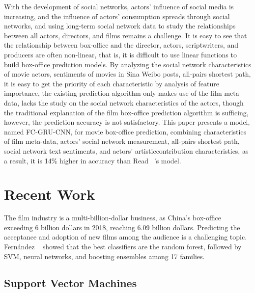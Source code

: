 \documentclass[review]{cvpr}
\begin{document}
  With the development of social networks, actors' influence of social media is increasing, and the influence of actors' consumption spreads through social networks,
  and using long-term social network data to study the relationships between all actors, directors, and films remains a challenge.
  It is easy to see that the relationship between box-office and the director, actors, scriptwriters, and producers are often non-linear, that is,
  it is difficult to use linear functions to build box-office prediction models.
  By analyzing the social network characteristics of movie actors, sentiments of movies in Sina Weibo posts, all-pairs shortest path,
  it is easy to get the priority of each characteristic by analysis of feature importance,
  the existing prediction algorithm only makes use of the film meta-data, lacks the study on the social network characteristics of the actors,
  though the traditional explanation of the film box-office prediction algorithm is sufficing, however, the prediction accuracy is not satisfactory.
  This paper presents a model, named FC-GRU-CNN, for movie box-office prediction, combining characteristics of film meta-data, actors' social network measurement,
  all-pairs shortest path, social network text sentiments, and actors' artisticcontribution characteristics,
  as a result, it is 14\% higher in accuracy than Read \etal ~\cite{read2016earning}'s model.


\section{Recent Work}

  The film industry is a multi-billion-dollar business, as China's box-office exceeding 6 billion dollars in 2018, reaching 6.09 billion dollars.
  Predicting the acceptance and adoption of new films among the audience is a challenging topic.
  Fern{\'a}ndez \etal ~\cite{fernandez2014we} showed that the best classifiers are the random forest,
  followed by SVM, neural networks, and boosting ensembles among 17 families.


\subsection{Support Vector Machines}
\end{document}
